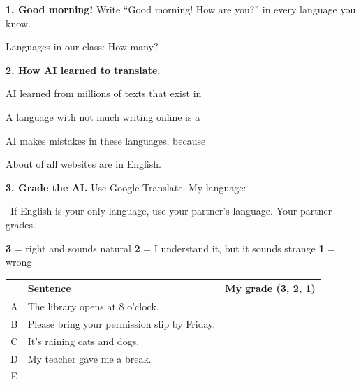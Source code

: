 \documentclass[11pt]{article}
\begin{document}
\partner


\vspace{0.4em}
{\large\textbf{1. Good morning!}} Write ``Good morning! How are you?'' in every language you know.

\vspace{0.6em}

\vspace{0.6em}
\blank{6.9in}

\vspace{0.6em}
Languages in our class:  \quad How many? \ansline{0.8in}{}

\vspace{1.0em}
{\large\textbf{2. How AI learned to translate.}}

\vspace{0.5em}
AI learned from millions of texts that exist in 

\vspace{0.7em}
A language with not much writing online is a 

\vspace{0.7em}
AI makes  mistakes in these languages, because 

\vspace{0.7em}
About  of all websites are in English.

\vspace{1.0em}
{\large\textbf{3. Grade the AI.}} Use Google Translate. My language: 

\vspace{0.3em}
\ELL\ If English is your only language, use your partner's language. Your partner grades.

\vspace{0.3em}
\textbf{3} = right and sounds natural \quad \textbf{2} = I understand it, but it sounds strange \quad \textbf{1} = wrong

\vspace{0.3em}
\begin{tabular}{|c|R{3.6in}|c|}
\hline
 & \textbf{Sentence} & \textbf{My grade (3, 2, 1)} \\ \hline
A & The library opens at 8 o'clock. &  \\ \hline
B & Please bring your permission slip by Friday. & \\ \hline
C & It's raining cats and dogs. &  \\ \hline
D & My teacher gave me a break. & \\ \hline
E &  & \\[0.6em] \hline
\end{tabular}
\end{document}
